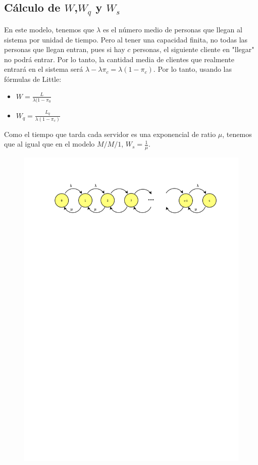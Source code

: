\begin{itemize}
			\subsection{C\'alculo de $W$,$W_q$ y $W_s$}
			\hspace{0.5cm}En este modelo, tenemos que $\lambda$ es el n\'umero medio de personas que llegan al sistema por unidad de tiempo. Pero al tener una capacidad finita, no todas las personas que llegan entran, pues si hay $c$ personas, el siguiente cliente en "llegar" $~$ no podr\'a entrar. Por lo tanto, la cantidad media de clientes que realmente entrar\'a en el sistema ser\'a $\lambda-\lambda\pi_c=\lambda(1-\pi_c)$. Por lo tanto, usando las f\'ormulas de Little:
			\begin{itemize}
				\item $\displaystyle W=\frac{L}{\lambda(1-\pi_0}$
				\item $\displaystyle W_q=\frac{L_q}{\lambda(1-\pi_c)}$
			\end{itemize}
	\hspace{0.5cm}	Como el tiempo que tarda cada servidor es una exponencial de ratio $\mu$, tenemos que al igual que en el modelo $M/M/1$, $W_s=\frac{1}{\mu}$.
		\end{itemize}
		
		
		\begin{figure}[h]
			\centering\includegraphics[trim = 10mm 220mm 10mm 25mm, clip,width=0.9\linewidth]{MMc}
		\end{figure}
		
